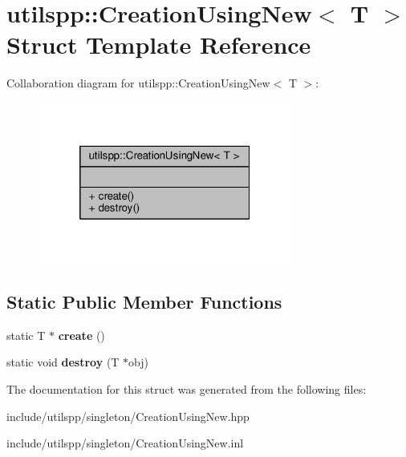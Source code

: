 \hypertarget{structutilspp_1_1CreationUsingNew}{\section{utilspp\-:\-:Creation\-Using\-New$<$ T $>$ Struct Template Reference}
\label{structutilspp_1_1CreationUsingNew}
}


Collaboration diagram for utilspp\-:\-:Creation\-Using\-New$<$ T $>$\-:\nopagebreak
\begin{figure}[H]
\begin{center}
\leavevmode
\includegraphics[width=236pt]{structutilspp_1_1CreationUsingNew__coll__graph}
\end{center}
\end{figure}
\subsection*{Static Public Member Functions}
\begin{DoxyCompactItemize}
\item 
\hypertarget{structutilspp_1_1CreationUsingNew_a105f82c90ac834842f9a8d8f7e9890fd}{static T $\ast$ {\bfseries create} ()}\label{structutilspp_1_1CreationUsingNew_a105f82c90ac834842f9a8d8f7e9890fd}

\item 
\hypertarget{structutilspp_1_1CreationUsingNew_a808b9cb86569dcef4fa7d13bf0fbbea8}{static void {\bfseries destroy} (T $\ast$obj)}\label{structutilspp_1_1CreationUsingNew_a808b9cb86569dcef4fa7d13bf0fbbea8}

\end{DoxyCompactItemize}


The documentation for this struct was generated from the following files\-:\begin{DoxyCompactItemize}
\item 
include/utilspp/singleton/Creation\-Using\-New.\-hpp\item 
include/utilspp/singleton/Creation\-Using\-New.\-inl\end{DoxyCompactItemize}
